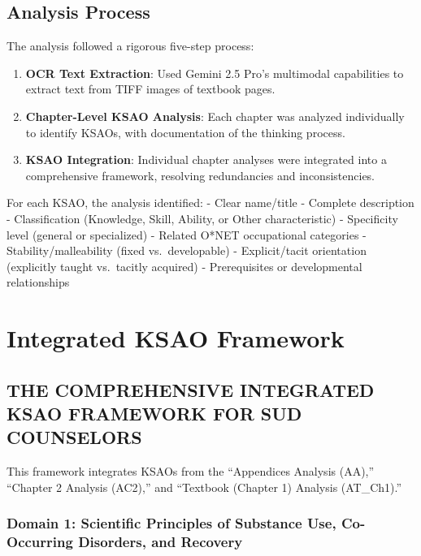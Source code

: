 \documentclass[
  letterpaper,
  DIV=11,
  numbers=noendperiod]{scrartcl}
\begin{document}
\subsection{Analysis Process}\label{analysis-process}

The analysis followed a rigorous five-step process:

\begin{enumerate}
\def\labelenumi{\arabic{enumi}.}
\item
  \textbf{OCR Text Extraction}: Used Gemini 2.5 Pro's multimodal
  capabilities to extract text from TIFF images of textbook pages.
\item
  \textbf{Chapter-Level KSAO Analysis}: Each chapter was analyzed
  individually to identify KSAOs, with documentation of the thinking
  process.
\item
  \textbf{KSAO Integration}: Individual chapter analyses were integrated
  into a comprehensive framework, resolving redundancies and
  inconsistencies.
\end{enumerate}

For each KSAO, the analysis identified: - Clear name/title - Complete
description - Classification (Knowledge, Skill, Ability, or Other
characteristic) - Specificity level (general or specialized) - Related
O*NET occupational categories - Stability/malleability (fixed
vs.~developable) - Explicit/tacit orientation (explicitly taught
vs.~tacitly acquired) - Prerequisites or developmental relationships

\section{Integrated KSAO Framework}\label{integrated-ksao-framework}

\subsection{THE COMPREHENSIVE INTEGRATED KSAO FRAMEWORK FOR SUD
COUNSELORS}\label{the-comprehensive-integrated-ksao-framework-for-sud-counselors}

This framework integrates KSAOs from the ``Appendices Analysis (AA),''
``Chapter 2 Analysis (AC2),'' and ``Textbook (Chapter 1) Analysis
(AT\_Ch1).''

\subsubsection{Domain 1: Scientific Principles of Substance Use,
Co-Occurring Disorders, and
Recovery}\label{domain-1-scientific-principles-of-substance-use-co-occurring-disorders-and-recovery}
\end{document}
